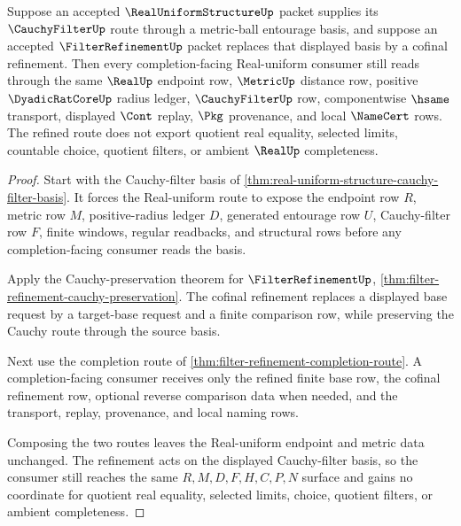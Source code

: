 \begin{theorem}
\label{thm:real-uniform-structure-filter-refinement-compatibility}
Suppose an accepted $\RealUniformStructureUp$ packet supplies its $\CauchyFilterUp$ route through a metric-ball entourage basis, and suppose an accepted $\FilterRefinementUp$ packet replaces that displayed basis by a cofinal refinement. Then every completion-facing Real-uniform consumer still reads through the same $\RealUp$ endpoint row, $\MetricUp$ distance row, positive $\DyadicRatCoreUp$ radius ledger, $\CauchyFilterUp$ row, componentwise $\hsame$ transport, displayed $\Cont$ replay, $\Pkg$ provenance, and local $\NameCert$ rows. The refined route does not export quotient real equality, selected limits, countable choice, quotient filters, or ambient $\RealUp$ completeness.
\end{theorem}
\begin{proof}
Start with the Cauchy-filter basis of \autoref{thm:real-uniform-structure-cauchy-filter-basis}. It forces the Real-uniform route to expose the endpoint row $R$, metric row $M$, positive-radius ledger $D$, generated entourage row $U$, Cauchy-filter row $F$, finite windows, regular readbacks, and structural rows before any completion-facing consumer reads the basis.

Apply the Cauchy-preservation theorem for $\FilterRefinementUp$, \autoref{thm:filter-refinement-cauchy-preservation}. The cofinal refinement replaces a displayed base request by a target-base request and a finite comparison row, while preserving the Cauchy route through the source basis.

Next use the completion route of \autoref{thm:filter-refinement-completion-route}. A completion-facing consumer receives only the refined finite base row, the cofinal refinement row, optional reverse comparison data when needed, and the transport, replay, provenance, and local naming rows.

Composing the two routes leaves the Real-uniform endpoint and metric data unchanged. The refinement acts on the displayed Cauchy-filter basis, so the consumer still reaches the same $R,M,D,F,H,C,P,N$ surface and gains no coordinate for quotient real equality, selected limits, choice, quotient filters, or ambient completeness.
\end{proof}

